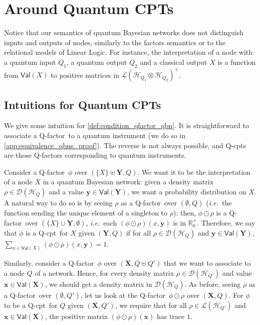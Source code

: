 \documentclass[10pt,a4paper]{article}
\newcommand*{\ie}{\emph{i.e.}\xspace}
\newcommand{\Real}{\mathbb{R}}
\newcommand*{\tens}{\otimes}
\newcommand*{\compfact}{\odot}
\newcommand{\nnReal}{\Real^+_0}
\newcommand*{\setofrv}[1]{\mathsf{Val}(#1)}
\newcommand{\bX}{\mathbf X}
\newcommand{\bY}{\mathbf Y}
\newcommand{\bx}{{\mathbf x}}
\newcommand{\by}{{\mathbf y}}
\renewcommand{\L}{\mathcal{L}}
\newcommand{\Pos}[1]{{\L(#1)}^+}
\newcommand{\D}{\mathcal{D}}
\newcommand{\HH}{\mathcal{H}}
\newcommand{\M}{\rho}
\newcommand{\reg}{Q}
\newcommand{\qreg}{\reg}
\newcommand*{\someqfact}{\phi}
\newcommand*{\qfactor}{Q-factor}
\newcommand*{\QCPT}{Quantum CPT}
\newcommand*{\qCPT}{Q-\textsf{cpt}\xspace}
\newcommand*{\qCPTs}{Q-\textsf{cpt}s\xspace}
\begin{document}
\section{Around \QCPT s}
\label{app:equivalence_qbns}

Notice that our semantics of quantum Bayesian networks does not distinguish inputs and outputs of nodes, similarly to the factors semantics or to the relational models of Linear Logic.
For instance, the interpretation of a node with a quantum input $\qreg_1$, a quantum output $\qreg_2$ and a classical output $X$ is a function from $\setofrv{X}$ to positive matrices in $\Pos{\HH_{\qreg_1} \tens \HH_{\qreg_2}}$.

\subsection{Intuitions for \QCPT s}
\label{sec:QCPT}

We give some intuition for \cref{def:condition_qfactor_qbn}.
It is straightforward to associate a \qfactor\ to a quantum instrument (we do so in \cref{app:equivalence_qbns_proof}).
The reverse is not always possible, and \qCPTs are those \qfactor s corresponding to quantum instruments.

Consider a \qfactor\ $\someqfact$ over $(\{X\}\uplus\bY,\qreg)$.
We want it to be the interpretation of a node $X$ in a quantum Bayesian network: given a density matrix $\M\in\D(\HH_\qreg)$ and a value $\by\in\setofrv{\bY}$, we want a probability distribution on $X$.
A natural way to do so is by seeing $\M$ as a \qfactor\ over $(\emptyset,\qreg)$ (\ie\ the function sending the unique element of a singleton to $\M$): then, $\someqfact\compfact\M$ is a \qfactor\ over $(\{X\}\cup\bY,\emptyset)$, \ie\ each $(\someqfact\compfact\M)(x,\by)$ is in $\nnReal$.
Therefore, we say that $\someqfact$ is a \qCPT\ for $X$ given $(\bY, \qreg)$ if for all $\M\in\D(\HH_\qreg)$ and $\by\in\setofrv{\bY}$, $\sum_{x\in\setofrv{X}}(\someqfact\compfact\M)(x,\by) = 1$.

Similarly, consider a \qfactor\ $\someqfact$ over $(\bX,\qreg\uplus\qreg')$ that we want to associate to a node $\qreg$ of a network.
Hence, for every density matrix $\M\in\D(\HH_{\qreg'})$ and value $\bx\in\setofrv{\bX}$, we should get a density matrix in $\D(\HH_{\qreg})$.
As before, seeing $\M$ as a \qfactor\ over $(\emptyset,\qreg')$, let us look at the \qfactor\ $\someqfact\compfact\M$ over $(\bX,\qreg)$.
For $\someqfact$ to be a \qCPT\ for $\qreg$ given $(\bX,\qreg')$, we require that for all $\M\in\L(\HH_{\qreg'})$ and $\bx\in\setofrv{\bX}$, the positive matrix $(\someqfact\compfact\M)(\bx)$ has trace $1$.
\end{document}
